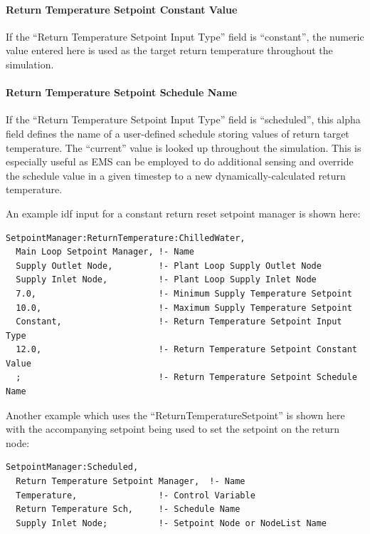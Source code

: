 \paragraph{Return Temperature Setpoint Constant Value}\label{return-temperature-setpoint-constant-value}

If the ``Return Temperature Setpoint Input Type'' field is ``constant'', the numeric value entered here is used as the target return temperature throughout the simulation.

\paragraph{Return Temperature Setpoint Schedule Name}\label{return-temperature-setpoint-schedule-name}

If the ``Return Temperature Setpoint Input Type'' field is ``scheduled'', this alpha field defines the name of a user-defined schedule storing values of return target temperature. The ``current'' value is looked up throughout the simulation. This is especially useful as EMS can be employed to do additional sensing and override the schedule value in a given timestep to a new dynamically-calculated return temperature.

An example idf input for a constant return reset setpoint manager is shown here:

\begin{lstlisting}
SetpointManager:ReturnTemperature:ChilledWater,
  Main Loop Setpoint Manager, !- Name
  Supply Outlet Node,         !- Plant Loop Supply Outlet Node
  Supply Inlet Node,          !- Plant Loop Supply Inlet Node
  7.0,                        !- Minimum Supply Temperature Setpoint
  10.0,                       !- Maximum Supply Temperature Setpoint
  Constant,                   !- Return Temperature Setpoint Input Type
  12.0,                       !- Return Temperature Setpoint Constant Value
  ;                           !- Return Temperature Setpoint Schedule Name
\end{lstlisting}

Another example which uses the ``ReturnTemperatureSetpoint'' is shown here with the accompanying setpoint being used to set the setpoint on the return node:

\begin{lstlisting}
SetpointManager:Scheduled,
  Return Temperature Setpoint Manager,  !- Name
  Temperature,                !- Control Variable
  Return Temperature Sch,     !- Schedule Name
  Supply Inlet Node;          !- Setpoint Node or NodeList Name
\end{lstlisting}

